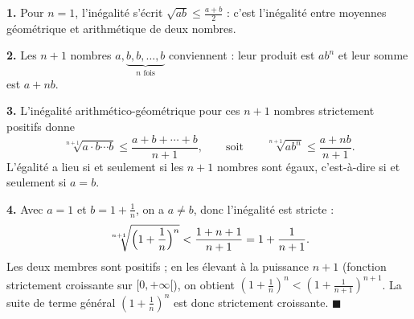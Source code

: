 \textbf{1.} Pour $n = 1$, l'inégalité s'écrit $\sqrt{ab} \leqslant \frac{a+b}{2}$ :
c'est l'inégalité entre moyennes géométrique et arithmétique de deux nombres.

\textbf{2.} Les $n+1$ nombres $a, \underbrace{b, b, \ldots, b}_{n \text{ fois}}$
conviennent : leur produit est $ab^n$ et leur somme est $a + nb$.

\textbf{3.} L'inégalité arithmético-géométrique pour ces $n+1$ nombres
strictement positifs donne
\[
\sqrt[n+1]{a \cdot b \cdots b} \leqslant \frac{a + b + \cdots + b}{n+1},
\qquad\text{soit}\qquad
\sqrt[n+1]{ab^n} \leqslant \frac{a + nb}{n+1}.
\]
L'égalité a lieu si et seulement si les $n+1$ nombres sont égaux,
c'est-à-dire si et seulement si $a = b$.

\textbf{4.} Avec $a = 1$ et $b = 1 + \frac1n$, on a $a \neq b$, donc
l'inégalité est stricte :
\[
\sqrt[n+1]{\Bigl(1 + \frac1n\Bigr)^n} < \frac{1 + n + 1}{n+1} = 1 + \frac{1}{n+1}.
\]
Les deux membres sont positifs ; en les élevant à la puissance $n+1$
(fonction strictement croissante sur $[0, +\infty[$), on obtient
$\left(1 + \frac1n\right)^n < \left(1 + \frac1{n+1}\right)^{n+1}$.
La suite de terme général $\left(1 + \frac1n\right)^n$ est donc strictement
croissante. \hfill $\blacksquare$
